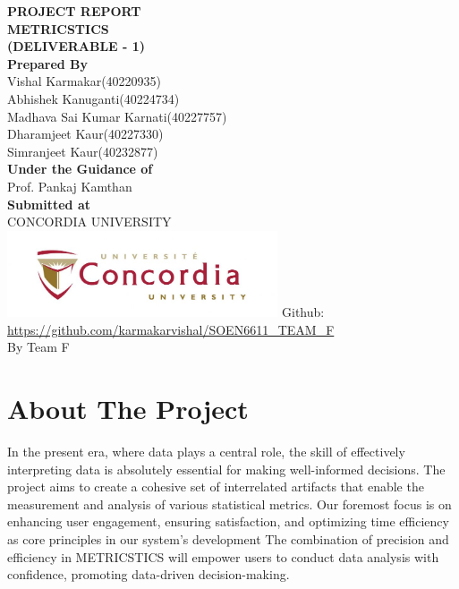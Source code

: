 \documentclass[12pt,letterpaper]{report}
\begin{document}
\begin{titlepage}
		\centering
		\Huge
		\textbf{PROJECT REPORT}\\
		\vspace{1cm}
		\textbf{METRICSTICS}\\
		\textbf{(DELIVERABLE - 1)}\\
		\vspace{1.5cm}
		\Large
		\textbf{Prepared By}\\
		\vspace{0.5cm}
		Vishal Karmakar(40220935)\\
		Abhishek Kanuganti(40224734)\\
            Madhava Sai Kumar Karnati(40227757)\\
            Dharamjeet Kaur(40227330)\\
            Simranjeet Kaur(40232877)\\
		\vspace{1.5cm}
		\large
		\textbf{Under the Guidance of}\\
		Prof. Pankaj Kamthan \\
		\vspace{1.5cm}
		\textbf{Submitted at}\\
		CONCORDIA UNIVERSITY\\
		\centering
		\includegraphics[width=8cm]{concordia.jpg}
		\vfill
		Github:\\
		\url{https://github.com/karmakarvishal/SOEN6611_TEAM_F} \\
		By Team F
		\thispagestyle{empty} 
	\end{titlepage}

 \tableofcontents 

 \chapter{About The Project}
In the present era, where data plays a central role, the skill of effectively interpreting data is absolutely essential for making well-informed decisions. The project aims to create a cohesive set of interrelated artifacts that enable the measurement and analysis of various statistical metrics. Our foremost focus is on enhancing user engagement, ensuring satisfaction, and optimizing time efficiency as core principles in our system's development The combination of precision and efficiency in METRICSTICS will empower users to conduct data analysis with confidence, promoting data-driven decision-making. 
\end{document}
